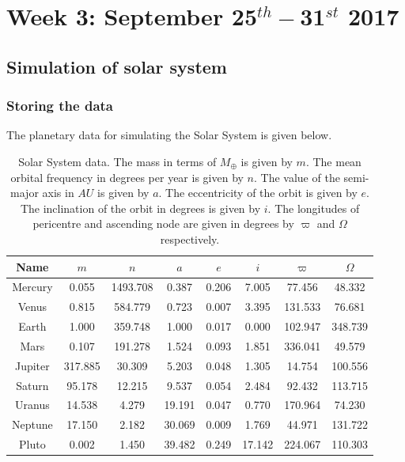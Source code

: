 \documentclass[11pt, oneside]{article}   	%
\begin{document}
\section{Week 3: September 25$^{th} - $31$^{st}$ 2017}

\subsection{Simulation of solar system}

\subsubsection*{Storing the data}

The planetary data for simulating the Solar System is given below.
\begin{table}[!h]
\centering
\caption{\small{Solar System data. The mass in terms of $M_{\oplus}$ is given by $m$. The mean orbital frequency in degrees per year is given by $n$. The value of the semi-major axis in $AU$ is given by $a$. The eccentricity of the orbit is given by $e$. The inclination of the orbit in degrees is given by $i$. The longitudes of pericentre and ascending node are given in degrees by $\varpi$ and $\Omega$ respectively.}}
\label{SSdata}
\begin{tabular}{|c|c|c|c|c|c|c|c|}
\hline
\rowcolor[HTML]{C0C0C0} 
Name    & $m$    & $n$        & $a$      & $e$     & $i$      & $\varpi$ & $\Omega$   \\ \hline
Mercury & 0.055   & 1493.708 & 0.387  & 0.206 & 7.005  & 77.456     & 48.332  \\ \hline
Venus   & 0.815   & 584.779  & 0.723  & 0.007 & 3.395  & 131.533    & 76.681  \\ \hline
Earth   & 1.000   & 359.748  & 1.000  & 0.017 & 0.000  & 102.947    & 348.739 \\ \hline
Mars    & 0.107   & 191.278  & 1.524  & 0.093 & 1.851  & 336.041    & 49.579  \\ \hline
Jupiter & 317.885 & 30.309   & 5.203  & 0.048 & 1.305  & 14.754     & 100.556 \\ \hline
Saturn  & 95.178  & 12.215   & 9.537  & 0.054 & 2.484  & 92.432     & 113.715 \\ \hline
Uranus  & 14.538  & 4.279    & 19.191 & 0.047 & 0.770  & 170.964    & 74.230  \\ \hline
Neptune & 17.150  & 2.182    & 30.069 & 0.009 & 1.769  & 44.971     & 131.722 \\ \hline
Pluto   & 0.002   & 1.450    & 39.482 & 0.249 & 17.142 & 224.067    & 110.303 \\ \hline
\end{tabular}
\end{table}
\end{document}
